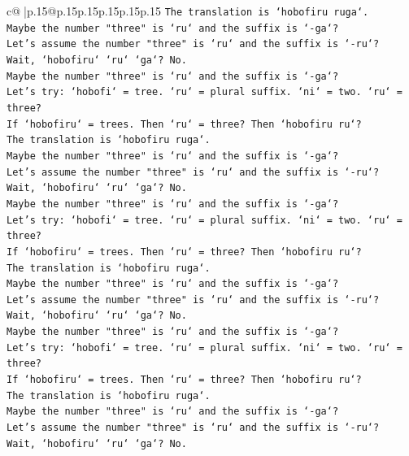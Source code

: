 \documentclass{article}
\begin{document}
{\begin{supertabular}{c@{$\;$}|p{.15\linewidth}@{}p{.15\linewidth}p{.15\linewidth}p{.15\linewidth}p{.15\linewidth}p{.15\linewidth}}
{{{\texttt{The translation is `hobofiru ruga`.} \\
\texttt{Maybe the number "three" is `ru` and the suffix is `{-}ga`?} \\
\texttt{Let's assume the number "three" is `ru` and the suffix is `{-}ru`?} \\
\texttt{Wait, `hobofiru` `ru` `ga`? No.} \\
\texttt{Maybe the number "three" is `ru` and the suffix is `{-}ga`?} \\
\texttt{Let's try: `hobofi` = tree. `ru` = plural suffix. `ni` = two. `ru` = three?} \\
\texttt{If `hobofiru` = trees. Then `ru` = three? Then `hobofiru ru`?} \\
\texttt{The translation is `hobofiru ruga`.} \\
\texttt{Maybe the number "three" is `ru` and the suffix is `{-}ga`?} \\
\texttt{Let's assume the number "three" is `ru` and the suffix is `{-}ru`?} \\
\texttt{Wait, `hobofiru` `ru` `ga`? No.} \\
\texttt{Maybe the number "three" is `ru` and the suffix is `{-}ga`?} \\
\texttt{Let's try: `hobofi` = tree. `ru` = plural suffix. `ni` = two. `ru` = three?} \\
\texttt{If `hobofiru` = trees. Then `ru` = three? Then `hobofiru ru`?} \\
\texttt{The translation is `hobofiru ruga`.} \\
\texttt{Maybe the number "three" is `ru` and the suffix is `{-}ga`?} \\
\texttt{Let's assume the number "three" is `ru` and the suffix is `{-}ru`?} \\
\texttt{Wait, `hobofiru` `ru` `ga`? No.} \\
\texttt{Maybe the number "three" is `ru` and the suffix is `{-}ga`?} \\
\texttt{Let's try: `hobofi` = tree. `ru` = plural suffix. `ni` = two. `ru` = three?} \\
\texttt{If `hobofiru` = trees. Then `ru` = three? Then `hobofiru ru`?} \\
\texttt{The translation is `hobofiru ruga`.} \\
\texttt{Maybe the number "three" is `ru` and the suffix is `{-}ga`?} \\
\texttt{Let's assume the number "three" is `ru` and the suffix is `{-}ru`?} \\
\texttt{Wait, `hobofiru` `ru` `ga`? No.} \\
}}}
\end{supertabular}}
\end{document}
